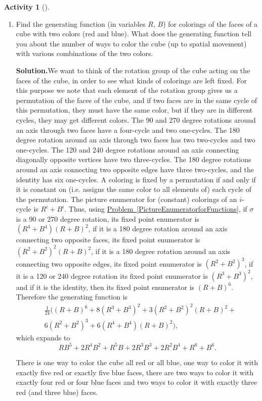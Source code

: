 \documentclass[10pt,]{book}
\theoremstyle{plain}
\theoremstyle{definition}
\newtheorem{activity}[project]{Activity}
\numberwithin{equation}{chapter}
\newcommand{\amp}{&}
\begin{document}
\begin{activity}[]
\begin{enumerate}[label=(\alph*)]
~\par
\item Find the generating function (in variables \(R\), \(B\)) for colorings of the faces of a cube with two colors (red and blue). What does the generating function tell you about the number of ways to color the cube (up to spatial movement) with various combinations of the two colors.%
\par\medskip\noindent%
\textbf{Solution.}\quad We want to think of the rotation group of the cube acting on the faces of the cube, in order to see what kinds of colorings are left fixed. For this purpose we note that each element of the rotation group gives us a permutation of the faces of the cube, and if two faces are in the same cycle of this permutation, they must have the same color, but if they are in different cycles, they may get different colors. The 90 and 270 degree rotations around an axis through two faces have a four-cycle and two one-cycles. The 180 degree rotation around an axis through two faces has two two-cycles and two one-cycles. The 120 and 240 degree rotations around an axis connecting diagonally opposite vertices have two three-cycles. The 180 degree rotations around an axis connecting two opposite edges have three two-cycles, and the identity has six one-cycles. A coloring is fixed by a permutation if and only if it is constant on (i.e. assigns the same color to all elements of) each cycle of the permutation. The picture enumerator for (constant) colorings of an \(i\)-cycle is \(R^i+B^i\). Thus, using \hyperref[PictureEnumeratorforFunctions]{Problem~\ref{PictureEnumeratorforFunctions}}, if \(\sigma\) is a 90 or 270 degree rotation, its fixed point enumerator is \((R^4+B^4)(R+B)^2\), if it is a 180 degree rotation around an axis connecting two opposite faces, its fixed point enumerator is \((R^2+B^2)^2(R+B)^2\), if it is a 180 degree rotation around an axis connecting two opposite edges, its fixed point enumerator is \((R^2+B^2)^3\), if it is a 120 or 240 degree rotation its fixed point enumerator is \((R^3+B^3)^2\), and if it is the identity, then its fixed point enumerator is \((R+B)^6\). Therefore the generating function is%
\begin{align*}
\amp \frac{1}{24}\big((R+B)^6 + 8(R^3+B^3)^2 + 3(R^2+B^2)^2(R+B)^2 +\\
\amp 6
(R^2+B^2)^3 + 6 (R^4+B^4)(R+B)^2\big),
\end{align*}
which expands to%
\begin{equation*}
RB^5+2R^4B^2+R^5B+2R^3B^3+2R^2B^4+R^6+B^6.
\end{equation*}
%
\par
There is one way to color the cube all red or all blue, one way to color it with exactly five red or exactly five blue faces, there are two ways to color it with exactly four red or four blue faces and two ways to color it with exactly three red (and three blue) faces.%

\end{enumerate}
\end{activity}
\typeout{************************************************}
\typeout{************************************************}
\end{document}
